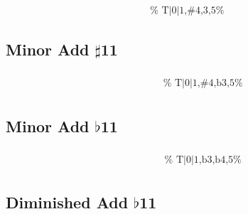 \documentclass[english]{./gbook}
\begin{document}
\begin{large}
\[\begin{array}{ll}
&
	\text{
	}
\end{array}
\]

\subsection*{Minor Add $\sharp$11}

\[
\begin{array}{ll}
	\begin{array}{c}
		\begin{array}{ccc}
			&%
			&%
		\end{array}
		\\
		\begin{array}{cc}
			&%
		\end{array}
	\end{array}

&
	\text{
	}
\end{array}
\]


\subsection*{Minor Add $\flat$11}

\[
\begin{array}{ll}
	\begin{array}{c}
		\begin{array}{ccc}
			&%
			&%
		\end{array}
		\\
		\begin{array}{cc}
			&%
		\end{array}
	\end{array}

&
	\text{
	}
\end{array}
\]


\subsection*{Diminished Add $\flat$11}

\[
\begin{array}{ll}
	\begin{array}{c}
		\begin{array}{ccc}
			&%
			&%
		\end{array}
		\\
		\begin{array}{cc}
			&%
		\end{array}
	\end{array}


\end{array}\]
\end{large}
\end{document}
